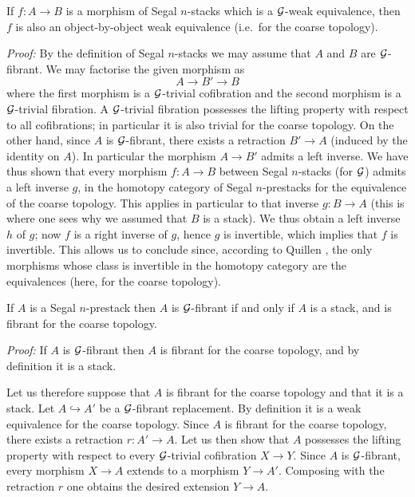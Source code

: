 \begin{lemma}
\label{morphentrechamps}
If $f:A\rightarrow B$ is a morphism of Segal $n$-stacks which is a
${\cal G}$-weak equivalence, then $f$ is also an object-by-object weak
equivalence (i.e.\ for the coarse topology).
\end{lemma}
{\em Proof:}
By the definition of Segal $n$-stacks we may assume that $A$ and $B$ are
${\cal G}$-fibrant. We may factorise the given morphism as
$$
A\rightarrow B' \rightarrow B
$$
where the first morphism is a ${\cal G}$-trivial cofibration and the second
morphism is a ${\cal G}$-trivial fibration. A ${\cal G}$-trivial fibration
possesses the lifting property with respect to all
cofibrations; in
particular it is also trivial for the coarse topology. On the other hand,
since $A$ is ${\cal G}$-fibrant, there exists a retraction $B'\rightarrow A$
(induced by the identity on $A$). In particular the morphism $A\rightarrow B'$
admits a left inverse. We have thus shown that every morphism
$f:A\rightarrow B$
between Segal $n$-stacks (for ${\cal G}$) admits a left inverse $g$, in the
homotopy category of Segal $n$-prestacks for the equivalence of the
coarse topology. This applies in
particular to that inverse $g:B\rightarrow A$ (this is where
one sees why we assumed that $B$ is a
stack). We thus obtain a left inverse $h$ of $g$; now $f$ is a right
inverse of $g$, hence $g$ is invertible, which implies that $f$ is
invertible. This allows us to conclude since, according to Quillen
\cite{Quillen}, the only morphisms
whose class is invertible in the homotopy category
are the
equivalences (here, for the coarse topology).
\eop

\begin{lemma}
\label{grofibchampimplfib}
If $A$ is a Segal $n$-prestack then $A$ is ${\cal G}$-fibrant if and
only
if $A$ is a stack, and is fibrant for the coarse topology.
\end{lemma}
{\em Proof:}
If $A$ is ${\cal G}$-fibrant then $A$ is
fibrant for the coarse topology, and by definition it is a stack.

Let us therefore suppose that $A$ is fibrant for the coarse topology and
that it is a stack.
Let $A\hookrightarrow A'$ be a ${\cal G}$-fibrant replacement.
By definition it is a weak equivalence for the coarse topology.
Since $A$ is fibrant for the coarse topology, there exists a retraction
$r:A'\rightarrow A$. Let us then show that $A$ possesses the lifting
property with respect to every ${\cal G}$-trivial cofibration $X\rightarrow Y$.
Since $A$ is ${\cal G}$-fibrant, every morphism $X\rightarrow A$ extends
to a morphism $Y\rightarrow A'$. Composing with the retraction $r$
one obtains the desired extension $Y\rightarrow A$.
\eop



